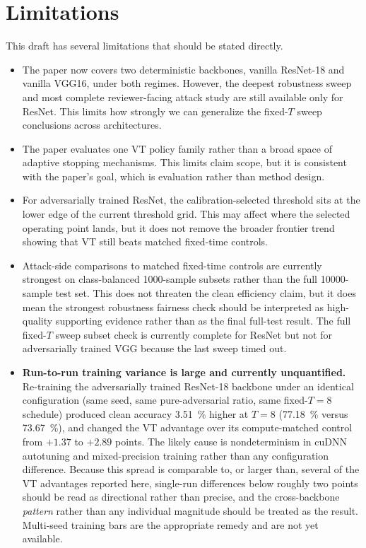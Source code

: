 \documentclass[11pt]{article}
\begin{document}
\begin{table}[t]
\section{Limitations}
This draft has several limitations that should be stated directly.
\begin{itemize}[leftmargin=1.3em]
\item The paper now covers two deterministic backbones, vanilla ResNet-18 and vanilla VGG16, under both regimes. However, the deepest robustness sweep and most complete reviewer-facing attack study are still available only for ResNet. This limits how strongly we can generalize the fixed-$T$ sweep conclusions across architectures.
\item The paper evaluates one VT policy family rather than a broad space of adaptive stopping mechanisms. This limits claim scope, but it is consistent with the paper's goal, which is evaluation rather than method design.
\item For adversarially trained ResNet, the calibration-selected threshold sits at the lower edge of the current threshold grid. This may affect where the selected operating point lands, but it does not remove the broader frontier trend showing that VT still beats matched fixed-time controls.
\item Attack-side comparisons to matched fixed-time controls are currently strongest on class-balanced \num{1000}-sample subsets rather than the full \num{10000}-sample test set. This does not threaten the clean efficiency claim, but it does mean the strongest robustness fairness check should be interpreted as high-quality supporting evidence rather than as the final full-test result. The full fixed-$T$ sweep subset check is currently complete for ResNet but not for adversarially trained VGG because the last sweep timed out.
\item \textbf{Run-to-run training variance is large and currently unquantified.} Re-training the adversarially trained ResNet-18 backbone under an identical configuration (same seed, same pure-adversarial ratio, same fixed-$T=8$ schedule) produced clean accuracy \SI{3.51}{\percent} higher at $T=8$ (\SI{77.18}{\percent} versus \SI{73.67}{\percent}), and changed the VT advantage over its compute-matched control from $+1.37$ to $+2.89$ points. The likely cause is nondeterminism in cuDNN autotuning and mixed-precision training rather than any configuration difference. Because this spread is comparable to, or larger than, several of the VT advantages reported here, single-run differences below roughly two points should be read as directional rather than precise, and the cross-backbone \emph{pattern} rather than any individual magnitude should be treated as the result. Multi-seed training bars are the appropriate remedy and are not yet available.

\end{itemize}
\end{table}
\end{document}
